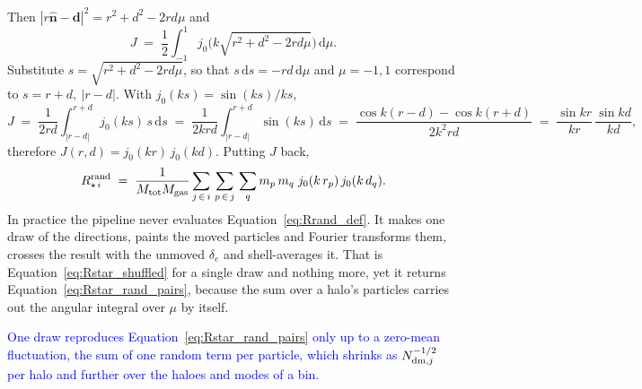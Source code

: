 \documentclass{article}
\newcommand{\dd}{\mathrm{d}}
\begin{document}
\begin{itemize}
{  Then $|r\hat{\mathbf n} - \mathbf d|^2 = r^2 + d^2 - 2rd\mu$ and
  \begin{equation}
    J \;=\; \frac12\int_{-1}^{1} j_0\Big(k\sqrt{r^2+d^2-2rd\mu}\Big)\,\dd\mu .
  \end{equation}
  Substitute $s = \sqrt{r^2+d^2-2rd\mu}$, so that $s\,\dd s = -rd\,\dd\mu$ and
  $\mu = -1, 1$ correspond to $s = r+d,\ |r-d|$. With $j_0(ks) = \sin(ks)/ks$,
  \begin{equation}
    J \;=\; \frac{1}{2rd}\int_{|r-d|}^{r+d} j_0(ks)\,s\,\dd s
      \;=\; \frac{1}{2krd}\int_{|r-d|}^{r+d}\sin(ks)\,\dd s
      \;=\; \frac{\cos k(r-d) - \cos k(r+d)}{2k^2rd}
      \;=\; \frac{\sin kr}{kr}\,\frac{\sin kd}{kd} ,
  \end{equation}
  therefore
  $J(r,d) = j_0(kr)\,j_0(kd)$. Putting $J$ back,
  \begin{equation}
    R_{\star\,i}^{\rm rand} \;=\; \frac{1}{M_{\rm tot}M_{\rm gas}}\sum_{j\,\in\,i}\,
    \sum_{p\,\in\,j}\,\sum_q m_p\,m_q\; j_0(k\,r_p)\,j_0(k\,d_q).
    \label{eq:Rstar_rand_pairs}
  \end{equation}
  In practice the pipeline never evaluates Equation~\eqref{eq:Rrand_def}. It
  makes one draw of the directions,
  paints the moved particles and Fourier transforms them, crosses the result with the unmoved $\delta_e$ and
  shell-averages it. That is
  Equation~\eqref{eq:Rstar_shuffled} for a single draw and nothing more, yet it
  returns Equation~\eqref{eq:Rstar_rand_pairs}, because the sum over a halo's
  particles carries out the angular integral over $\mu$ by itself.}

  \textcolor{blue}{One draw reproduces Equation~\eqref{eq:Rstar_rand_pairs}
  only up to a zero-mean fluctuation, the sum of one random term per particle,
  which shrinks as $N_{{\rm dm},j}^{-1/2}$ per halo and further over the
  haloes and modes of a bin.}


\end{itemize}
\end{document}
